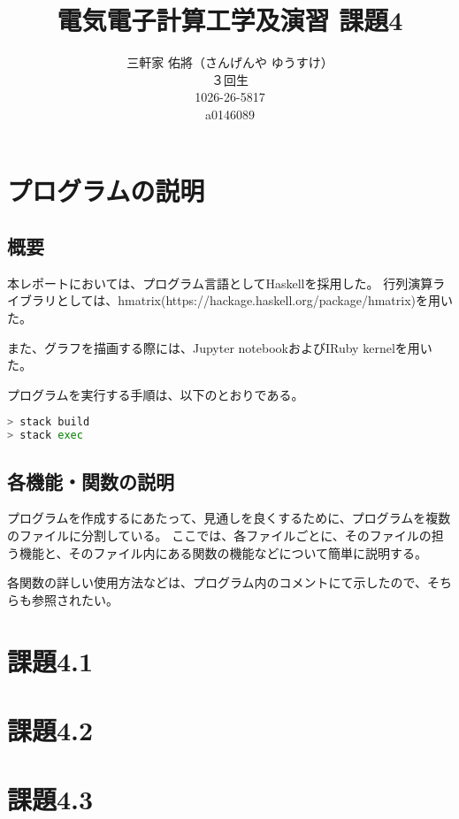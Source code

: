 \documentclass[11pt]{jsarticle}
\title{電気電子計算工学及演習 課題4}
\author{三軒家 佑將（さんげんや ゆうすけ） \\ ３回生 \\ 1026-26-5817 \\ a0146089}
\date{}
\begin{document}
\maketitle

\section{プログラムの説明}
\subsection{概要}
本レポートにおいては、プログラム言語としてHaskellを採用した。
行列演算ライブラリとしては、hmatrix(https://hackage.haskell.org/package/hmatrix)を用いた。

また、グラフを描画する際には、Jupyter notebookおよびIRuby kernelを用いた。

プログラムを実行する手順は、以下のとおりである。
\begin{lstlisting}[language=bash]
> stack build
> stack exec 
\end{lstlisting}

\subsection{各機能・関数の説明}
プログラムを作成するにあたって、見通しを良くするために、プログラムを複数のファイルに分割している。
ここでは、各ファイルごとに、そのファイルの担う機能と、そのファイル内にある関数の機能などについて簡単に説明する。

各関数の詳しい使用方法などは、プログラム内のコメントにて示したので、そちらも参照されたい。


\section{課題4.1}
\section{課題4.2}
\section{課題4.3}
\end{document}
